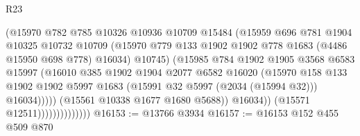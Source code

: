 \begin{lexlean}{R23}
\begin{coremodule}
                                      (@15970
                                        @782
                                        @785
                                        @10326
                                        @10936
                                        @10709
                                        @15484
                                        (@15959
                                          @696
                                          @781
                                          @1904
                                          @10325
                                          @10732
                                          @10709
                                          (@15970
                                            @779
                                            @133
                                            @1902
                                            @1902
                                            @778
                                            @1683
                                            (@4486 @15950 @698 @778)
                                            @16034)
                                          @10745)
                                        (@15985
                                          @784
                                          @1902
                                          @1905
                                          @3568
                                          @6583
                                          @15997
                                          (@16010
                                            @385
                                            @1902
                                            @1904
                                            @2077
                                            @6582
                                            @16020
                                            (@15970
                                              @158
                                              @133
                                              @1902
                                              @1902
                                              @5997
                                              @1683
                                              (@15991 @32 @5997 (@2034 (@15994 @32)))
                                              @16034)))))
                                    (@15561 @10338 @1677 @1680 @5688))
                                  @16034))
                              (@15571 @12511))))))))))))))
@16153 := @13766 @3934
@16157 := @16153 @152 @455 @509 @870

\end{coremodule}
\end{lexlean}
